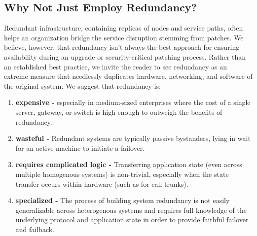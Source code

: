 \subsection{Why Not Just Employ Redundancy?}
\label{ssec:redundancy}

Redundant infrastructure, containing replicas of nodes and service
paths, often helps an organization bridge the service disruption
stemming from patches.  We believe, however, that redundancy isn't
always the best approach for ensuring availability during an upgrade
or security-critical patching process.  Rather than an established
best practice, we invite the reader to see redundancy as
an extreme measure that needlessly duplicates hardware, networking, and
software of the original system. We suggest that redundancy is: 


\renewcommand{\labelenumi}{\alph{enumi}.}

\begin{enumerate}
\item {\bf expensive -} especially in medium-sized enterprises where
  the cost of a single server, gateway, or switch is high enough to
  outweigh the benefits of redundancy.

\item {\bf wasteful -} Redundant systems are typically passive
  bystanders, lying in wait for an active machine to
  initiate a failover.

\item {{\bf requires complicated logic -}} Transferring application
  state (even across multiple homogenous systems) is non-trivial,
  especially when the state transfer occurs within hardware (such as
  for call trunks).

\item {{\bf specialized -}} The process of building system redundancy
  is not easily generalizable across heterogenous systems and requires
  full knowledge of the underlying protocol and application state in
  order to provide faithful failover and failback.
\end{enumerate}
